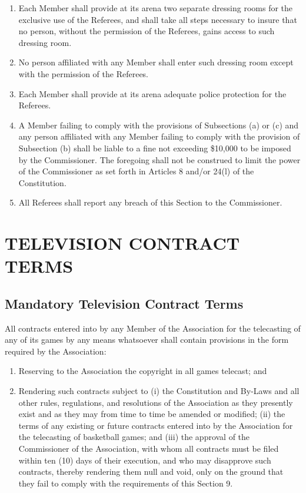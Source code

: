 \documentclass[]{book}
\providecommand{\tightlist}{%
  \setlength{\itemsep}{0pt}\setlength{\parskip}{0pt}}
\begin{document}
\begin{enumerate}
\def\labelenumi{(\alph{enumi})}
\tightlist
\item
  Each Member shall provide at its arena two separate dressing rooms for the exclusive use of the Referees, and shall take all steps necessary to insure that no person, without the permission of the Referees, gains access to such dressing room.
\item
  No person affiliated with any Member shall enter such dressing room except with the permission of the Referees.
\item
  Each Member shall provide at its arena adequate police protection for the Referees.
\item
  A Member failing to comply with the provisions of Subsections (a) or (c) and any person affiliated with any Member failing to comply with the provision of Subsection (b) shall be liable to a fine not exceeding \$10,000 to be imposed by the Commissioner. The foregoing shall not be construed to limit the power of the Commissioner as set forth in Articles 8 and/or 24(l) of the Constitution.
\item
  All Referees shall report any breach of this Section to the Commissioner.
\end{enumerate}

\hypertarget{television-contract-terms}{%
\section{TELEVISION CONTRACT TERMS}\label{television-contract-terms}}

\hypertarget{mandatory-television-contract-terms}{%
\subsection{Mandatory Television Contract Terms}\label{mandatory-television-contract-terms}}

All contracts entered into by any Member of the Association for the telecasting of any of its games by any means whatsoever shall contain provisions in the form required by the Association:

\begin{enumerate}
\def\labelenumi{(\alph{enumi})}
\tightlist
\item
  Reserving to the Association the copyright in all games telecast; and
\item
  Rendering such contracts subject to (i) the Constitution and By-Laws and all other rules, regulations, and resolutions of the Association as they presently exist and as they may from time to time be amended or modified; (ii) the terms of any existing or future contracts entered into by the Association for the telecasting of basketball games; and (iii) the approval of the Commissioner of the Association, with whom all contracts must be filed within ten (10) days of their execution, and who may disapprove such contracts, thereby rendering them null and void, only on the ground that they fail to comply with the requirements of this Section 9.
\end{enumerate}
\end{document}
